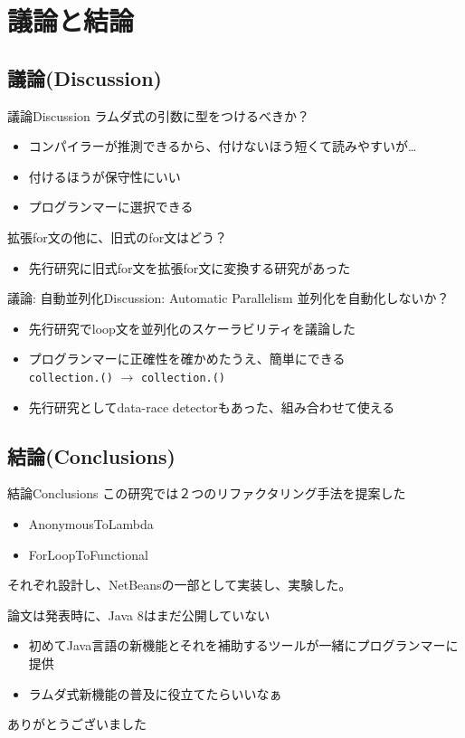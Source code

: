 \section{議論と結論}
\subsection{議論(Discussion)}
\begin{frame}{議論}{Discussion}
ラムダ式の引数に型をつけるべきか？
\begin{itemize}
  \item コンパイラーが推測できるから、付けないほう短くて読みやすいが\ldots
  \item 付けるほうが保守性にいい
  \item プログランマーに選択できる
\end{itemize}
拡張for文の他に、旧式のfor文はどう？
\begin{itemize}
  \item 先行研究に旧式for文を拡張for文に変換する研究があった
\end{itemize}
\end{frame}
\begin{frame}{議論: 自動並列化}{Discussion: Automatic Parallelism}
並列化を自動化しないか？
\begin{itemize}
  \item 先行研究でloop文を並列化のスケーラビリティを議論した
  \item プログランマーに正確性を確かめたうえ、簡単にできる\\
        \texttt{collection.\color{red}{stream}()} $\rightarrow$ \texttt{collection.\color{red}{parallelStream}()}
  \item 先行研究としてdata-race detectorもあった、組み合わせて使える
\end{itemize}
\end{frame}
\subsection{結論(Conclusions)}
\begin{frame}{結論}{Conclusions}
  この研究では２つのリファクタリング手法を提案した
  \begin{itemize}
    \item AnonymousToLambda
    \item ForLoopToFunctional
  \end{itemize}
  それぞれ設計し、NetBeansの一部として実装し、実験した。

  論文は発表時に、Java 8はまだ公開していない
  \begin{itemize}
    \item 初めてJava言語の新機能とそれを補助するツールが一緒にプログランマーに提供
    \item ラムダ式新機能の普及に役立てたらいいなぁ
  \end{itemize}
\end{frame}
\backupbegin

\begin{frame}

  \center \Huge ありがとうございました
\end{frame}

\backupend

